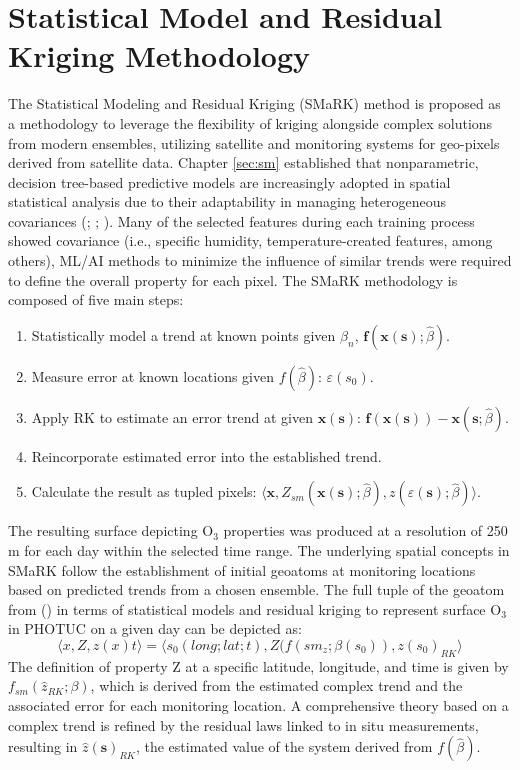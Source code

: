\section{Statistical Model and Residual Kriging Methodology} \label{methods:smark} The Statistical Modeling and Residual Kriging (SMaRK) method is proposed as a methodology to leverage the flexibility of kriging alongside complex solutions from modern ensembles, utilizing satellite and monitoring systems for geo-pixels derived from satellite data. Chapter \ref{sec:sm} established that nonparametric, decision tree-based predictive models are increasingly adopted in spatial statistical analysis due to their adaptability in managing heterogeneous covariances (\cite{liu_improve_2018}; \cite{mu_estimation_2023}; \cite{pan_comparison_2023}). Many of the selected features during each training process showed covariance (i.e., specific humidity, temperature-created features, among others), ML/AI methods to minimize the influence of similar trends were required to define the overall property for each pixel. The SMaRK methodology is composed of five main steps:
\begin{enumerate}
    \item Statistically model a trend at known points given $\beta_n$, $\bm{f}\left(\bm{x}\left(\bm{s}\right);\hat{\beta}\right)$.
    \item Measure error at known locations given $f(\hat{\beta})$: $\varepsilon\left(s_0\right)$.
    \item Apply RK to estimate an error trend at given $\bm{x}\left(\bm{s}\right)$: $\bm{f}\left(\bm{x}\left(\bm{s}\right)\right) - \bm{x}\left(\bm{s};\hat{\beta}\right)$.
    \item Reincorporate estimated error into the established trend.
    \item Calculate the result as tupled pixels: $\langle\bm{x},Z_{sm}\left(\bm{x}\left(\bm{s}\right);\hat{\beta}\right),z\left(\varepsilon(\bm{s});\hat{\beta}\right)\rangle$.
\end{enumerate}
The resulting surface depicting O$_3$ properties was produced at a resolution of 250 m for each day within the selected time range. The underlying spatial concepts in SMaRK follow the establishment of initial geoatoms at monitoring locations based on predicted trends from a chosen ensemble. The full tuple of the geoatom from (\cite{goodchild_towards_2007}) in terms of statistical models and residual kriging to represent surface O$_3$ in PHOTUC on a given day can be depicted as:
\[
 \langle x,Z,z(x)t \rangle = \langle s_{0}(long;lat;t),Z(f(sm_{z};\beta(s_{0})),z{(s_0)}_{RK} \rangle
\]
The definition of property Z at a specific latitude, longitude, and time is given by $f_{sm}({\hat{z}}_{RK};\beta)$, which is derived from the estimated complex trend and the associated error for each monitoring location. A comprehensive theory based on a complex trend is refined by the residual laws linked to in situ measurements, resulting in $\hat{z}{(\mathbf{s})}_{RK}$, the estimated value of the system derived from $f(\hat{\beta})$. 
